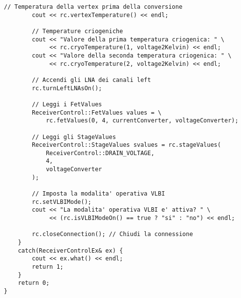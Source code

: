 \begin{lstlisting}[caption={[Esempio di utilizzo della libreria \texttt{ReceiverLibrary}]Esempio 
di utilizzo della libreria \texttt{ReceiverLibrary}},
label=lst:receiver-library,mathescape]
        // Temperatura della vertex prima della conversione
        cout << rc.vertexTemperature() << endl;

        // Temperature criogeniche
        cout << "Valore della prima temperatura criogenica: " \
             << rc.cryoTemperature(1, voltage2Kelvin) << endl;
        cout << "Valore della seconda temperatura criogenica: " \
             << rc.cryoTemperature(2, voltage2Kelvin) << endl;

        // Accendi gli LNA dei canali left
        rc.turnLeftLNAsOn();

        // Leggi i FetValues
        ReceiverControl::FetValues values = \
            rc.fetValues(0, 4, currentConverter, voltageConverter);

        // Leggi gli StageValues
        ReceiverControl::StageValues svalues = rc.stageValues(
            ReceiverControl::DRAIN_VOLTAGE,
            4,
            voltageConverter
        );

        // Imposta la modalita' operativa VLBI
        rc.setVLBIMode();
        cout << "La modalita' operativa VLBI e' attiva? " \
             << (rc.isVLBIModeOn() == true ? "si" : "no") << endl;

        rc.closeConnection(); // Chiudi la connessione
    }
    catch(ReceiverControlEx& ex) {
        cout << ex.what() << endl;
        return 1;
    }
    return 0;
}
\end{lstlisting}
\lstset{numbers=none}

